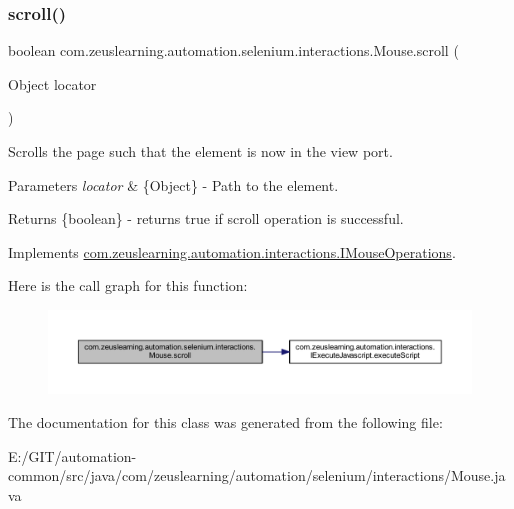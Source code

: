 \subsubsection{\texorpdfstring{scroll()}{scroll()}\hspace{0.1cm}{\footnotesize\ttfamily [2/2]}}
{\footnotesize\ttfamily boolean com.\+zeuslearning.\+automation.\+selenium.\+interactions.\+Mouse.\+scroll (\begin{DoxyParamCaption}\item[{Object}]{locator }\end{DoxyParamCaption})\hspace{0.3cm}{\ttfamily [inline]}}

Scrolls the page such that the element is now in the view port.


\begin{DoxyParams}{Parameters}
{\em locator} & \{Object\} -\/ Path to the element.\\
\hline
\end{DoxyParams}
\begin{DoxyReturn}{Returns}
\{boolean\} -\/ returns {\ttfamily true} if scroll operation is successful. 
\end{DoxyReturn}


Implements \hyperlink{interfacecom_1_1zeuslearning_1_1automation_1_1interactions_1_1IMouseOperations_af08b8fe7ad0752c04b8760247e944158}{com.\+zeuslearning.\+automation.\+interactions.\+I\+Mouse\+Operations}.

Here is the call graph for this function\+:
\nopagebreak
\begin{figure}[H]
\begin{center}
\leavevmode
\includegraphics[width=350pt]{d0/dfa/classcom_1_1zeuslearning_1_1automation_1_1selenium_1_1interactions_1_1Mouse_a64c168b0d5f3a2df84426d3723960a97_cgraph}
\end{center}
\end{figure}


The documentation for this class was generated from the following file\+:\begin{DoxyCompactItemize}
\item 
E\+:/\+G\+I\+T/automation-\/common/src/java/com/zeuslearning/automation/selenium/interactions/Mouse.\+java\end{DoxyCompactItemize}
